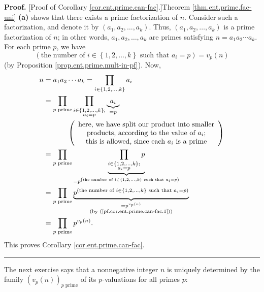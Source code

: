 \documentclass[numbers=enddot,12pt,final,onecolumn,notitlepage]{scrartcl}%
\newcounter{exer}
\numberwithin{exer}{subsection}
\theoremstyle{definition}
\newenvironment{proof}[1][Proof]{\noindent\textbf{#1.} }{\ \rule{0.5em}{0.5em}}
\let\prodnonlimits\prod
\renewcommand{\prod}{\prodnonlimits\limits}
\begin{document}
\begin{proof}
[Proof of Corollary \ref{cor.ent.prime.can-fac}.]Theorem
\ref{thm.ent.prime.fac-uni} \textbf{(a)} shows that there exists a prime
factorization of $n$. Consider such a factorization, and denote it by $\left(
a_{1},a_{2},\ldots,a_{k}\right)  $. Thus, $\left(  a_{1},a_{2},\ldots
,a_{k}\right)  $ is a prime factorization of $n$; in other words, $a_{1}%
,a_{2},\ldots,a_{k}$ are primes satisfying $n=a_{1}a_{2}\cdots a_{k}$. For
each prime $p$, we have%
\begin{equation}
\left(  \text{the number of }i\in\left\{  1,2,\ldots,k\right\}  \text{ such
that }a_{i}=p\right)  =v_{p}\left(  n\right)
\label{pf.cor.ent.prime.can-fac.1}%
\end{equation}
(by Proposition \ref{prop.ent.prime.mult-in-pf}). Now,%
\begin{align*}
n  &  =a_{1}a_{2}\cdots a_{k}=\prod_{i\in\left\{  1,2,\ldots,k\right\}  }%
a_{i}\\
&  =\prod_{p\text{ prime}}\prod_{\substack{i\in\left\{  1,2,\ldots,k\right\}
;\\a_{i}=p}}\underbrace{a_{i}}_{=p}\\
&  \ \ \ \ \ \ \ \ \ \ \left(
\begin{array}
[c]{c}%
\text{here, we have split our product into smaller}\\
\text{products, according to the value of }a_{i}\text{;}\\
\text{this is allowed, since each }a_{i}\text{ is a prime}%
\end{array}
\right) \\
&  =\prod_{p\text{ prime}}\underbrace{\prod_{\substack{i\in\left\{
1,2,\ldots,k\right\}  ;\\a_{i}=p}}p}_{=p^{\left(  \text{the number of }%
i\in\left\{  1,2,\ldots,k\right\}  \text{ such that }a_{i}=p\right)  }}\\
&  =\prod_{p\text{ prime}}\underbrace{p^{\left(  \text{the number of }%
i\in\left\{  1,2,\ldots,k\right\}  \text{ such that }a_{i}=p\right)  }%
}_{\substack{=p^{v_{p}\left(  n\right)  }\\\text{(by
(\ref{pf.cor.ent.prime.can-fac.1}))}}}\\
&  =\prod_{p\text{ prime}}p^{v_{p}\left(  n\right)  }.
\end{align*}
This proves Corollary \ref{cor.ent.prime.can-fac}.
\end{proof}

The next exercise says that a nonnegative integer $n$ is uniquely determined
by the family $\left(  v_{p}\left(  n\right)  \right)  _{p\text{ prime}}$ of
its $p$-valuations for all primes $p$:
\end{document}
